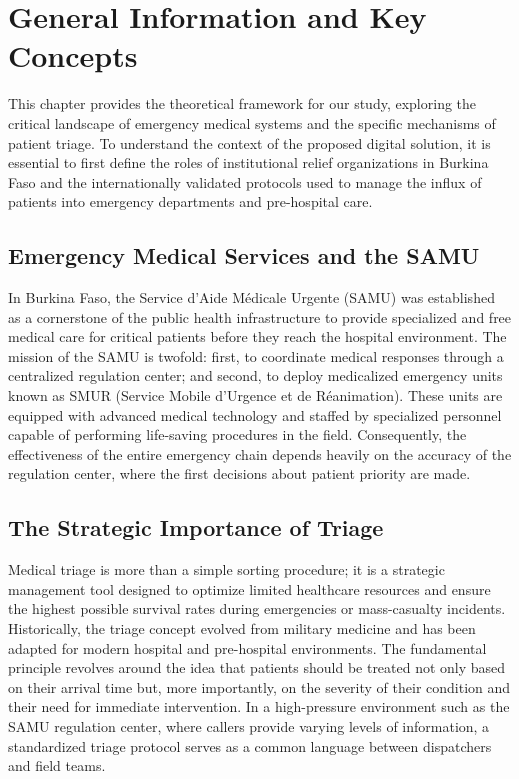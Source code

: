 \chapter{General Information and Key Concepts}
\thispagestyle{fancy}
\justifying

This chapter provides the theoretical framework for our study, exploring the critical landscape of emergency medical systems and the specific mechanisms of patient triage. To understand the context of the proposed digital solution, it is essential to first define the roles of institutional relief organizations in Burkina Faso and the internationally validated protocols used to manage the influx of patients into emergency departments and pre-hospital care.

\section{Emergency Medical Services and the SAMU}
In Burkina Faso, the Service d'Aide M\'edicale Urgente (SAMU) was established as a cornerstone of the public health infrastructure to provide specialized and free medical care for critical patients before they reach the hospital environment. The mission of the SAMU is twofold: first, to coordinate medical responses through a centralized regulation center; and second, to deploy medicalized emergency units known as SMUR (Service Mobile d'Urgence et de R\'eanimation). These units are equipped with advanced medical technology and staffed by specialized personnel capable of performing life-saving procedures in the field. Consequently, the effectiveness of the entire emergency chain depends heavily on the accuracy of the regulation center, where the first decisions about patient priority are made.

\section{The Strategic Importance of Triage}
Medical triage is more than a simple sorting procedure; it is a strategic management tool designed to optimize limited healthcare resources and ensure the highest possible survival rates during emergencies or mass-casualty incidents. Historically, the triage concept evolved from military medicine and has been adapted for modern hospital and pre-hospital environments. The fundamental principle revolves around the idea that patients should be treated not only based on their arrival time but, more importantly, on the severity of their condition and their need for immediate intervention. In a high-pressure environment such as the SAMU regulation center, where callers provide varying levels of information, a standardized triage protocol serves as a common language between dispatchers and field teams.

